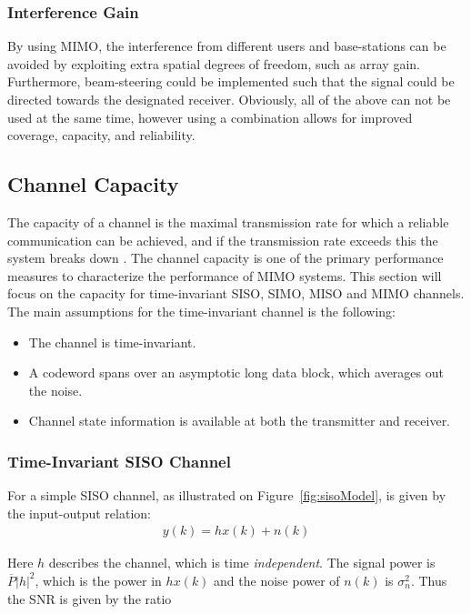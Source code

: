 \subsubsection{Interference Gain}
By using MIMO, the interference from different users and base-stations can be avoided by exploiting extra spatial degrees of freedom, such as array gain. Furthermore, beam-steering could be implemented such that the signal could be directed towards the designated receiver. Obviously, all of the above can not be used at the same time, however using a combination  allows for improved coverage, capacity, and reliability. \cite{Tim2012Practical} 

\subsection{Channel Capacity}
\def\snr{\text{SNR}_{\text{AWGN}}}
\def\PP{\overline{P}}
\def\CC{C_{\text{AWGN}}}

The capacity of a channel is the maximal transmission rate for which a reliable communication can be achieved, and if the transmission rate exceeds this the system breaks down \cite{Tim2012Practical}. The channel capacity is one of the primary performance measures to characterize the performance of MIMO systems\cite{Tim2012Practical}. This section will focus on the capacity for time-invariant SISO, SIMO, MISO and MIMO channels. The main assumptions for the time-invariant channel is the following\cite{Tim2012Practical}: 
\begin{itemize}
\item The channel is time-invariant.
\item A codeword spans over an asymptotic long data block, which averages out the noise.
\item Channel state information is available at both the transmitter and receiver. 
\end{itemize}

\subsubsection{Time-Invariant SISO Channel}
For a simple SISO channel, as illustrated on Figure~\ref{fig:sisoModel}, is given by the input-output relation:
\begin{align*}
  y(k) = h x(k) + n(k)
\end{align*}

Here $h$ describes the channel, which is time \emph{independent}. The signal power is $\PP |h|^2$, which is the power in $h x(k)$ and the noise power of $n(k)$ is $\sigma_n^2$. Thus the SNR is given by the ratio\cite{Tim2012Practical}

